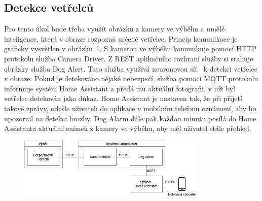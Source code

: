 \subsection{Detekce vetřelců}
Pro tento úkol bude třeba využít obrázků z kamery ve výběhu a umělé inteligence, která v obraze rozpozná určené vetřelce.
Princip komunikace je graficky vysvětlen v obrázku~\ref{fig:detekce_vetrelcu}.\newline
S kamerou ve výběhu komunikuje pomocí HTTP protokolu služba Camera Driver.
Z REST aplikačního rozhraní služby si stahuje obrázky služba Dog Alert.
Tato služba využívá neuronovou síť~\cite{neuronovesite} k detekci vetřelce v obraze.
Pokud je detekováno nějaké nebezpečí, služba pomocí MQTT protokolu informuje systém Home Assistant a předá mu aktuální fotografii, v níž byl vetřelec detekován jako důkaz.
Home Assistant je nastaven tak, že při přijetí takové zprávy, odešle uživateli do aplikace v mobilním telefonu oznámení, aby ho upozornil na detekci hrozby.
Dog Alarm dále pak každou minutu posílá do Home Assistanta aktuální snímek z kamery ve výběhu, aby měl uživatel stále přehled.
\begin{figure}[h]
    \centering
    \includegraphics[width=0.8\textwidth]{img/detekce_vetrelcu}
    \label{fig:detekce_vetrelcu}
\end{figure}

